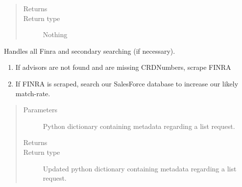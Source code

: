 \documentclass[letterpaper,10pt,english]{sphinxmanual}
\begin{document}
\begin{fulllineitems}
\begin{fulllineitems}
\begin{quote}
\begin{description}
\item[{Returns}] \leavevmode


\item[{Return type}] \leavevmode
Nothing

\end{description}\end{quote}

\end{fulllineitems}


\begin{fulllineitems}
\label{\detokenize{index:ListManagement.list_processing.ListProcessing.finra_search_and_search_two}}
Handles all Finra and secondary searching (if necessary).
\begin{enumerate}
\def\theenumi{\arabic{enumi}}
\def\labelenumi{\theenumi )}
\makeatletter\def\p@enumii{\p@enumi \theenumi )}\makeatother
\item {} 
If advisors are not found and are missing CRDNumbers, scrape FINRA

\item {} 
If FINRA is scraped, search our SalesForce database to increase our likely match-rate.

\end{enumerate}
\begin{quote}\begin{description}
\item[{Parameters}] \leavevmode
{} \textendash{} Python dictionary containing metadata regarding a list request.

\item[{Returns}] \leavevmode


\item[{Return type}] \leavevmode
Updated python dictionary containing metadata regarding a list request.

\end{description}\end{quote}

\end{fulllineitems}



\end{fulllineitems}
\end{document}

